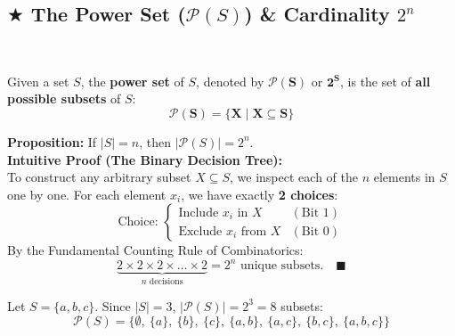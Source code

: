 \documentclass[11pt,a4paper]{article}
\begin{document}
\subsection{\texorpdfstring{$\bigstar$ }{*}The Power Set (\texorpdfstring{$\mathcal{P}(S)$}{P(S)}) \& Cardinality \texorpdfstring{$2^n$}{2\textasciicircum n}}
\\[3pt]
\begin{defbox}
Given a set $S$, the \textbf{power set} of $S$, denoted by $\mathbf{\mathcal{P}(S)}$ or $\mathbf{2^S}$, is the set of \textbf{all possible subsets} of $S$:
\[
\mathbf{\mathcal{P}(S) = \{ X \mid X \subseteq S \}}
\]
\end{defbox}

\begin{theorembox}
\textbf{Proposition:} If $|S| = n$, then $|\mathcal{P}(S)| = 2^n$.\\
\textbf{Intuitive Proof (The Binary Decision Tree):}\\
To construct any arbitrary subset $X \subseteq S$, we inspect each of the $n$ elements in $S$ one by one. For each element $x_i$, we have exactly \textbf{2 choices}:
\[
\text{Choice: } \begin{cases} \text{Include } x_i \text{ in } X & (\text{Bit } 1) \\ \text{Exclude } x_i \text{ from } X & (\text{Bit } 0) \end{cases}
\]
By the Fundamental Counting Rule of Combinatorics:
\[
\underbrace{2 \times 2 \times 2 \times \dots \times 2}_{n \text{ decisions}} = 2^n \text{ unique subsets}. \quad \blacksquare
\]
\end{theorembox}

\begin{examplebox}[Tracing All Subsets of $S = \{a, b, c\}$]
Let $S = \{a, b, c\}$. Since $|S| = 3$, $|\mathcal{P}(S)| = 2^3 = 8$ subsets:
\[
\mathcal{P}(S) = \big\{ \emptyset, \ \{a\}, \ \{b\}, \ \{c\}, \ \{a, b\}, \ \{a, c\}, \ \{b, c\}, \ \{a, b, c\} \big\}
\]
\end{examplebox}
\end{document}
